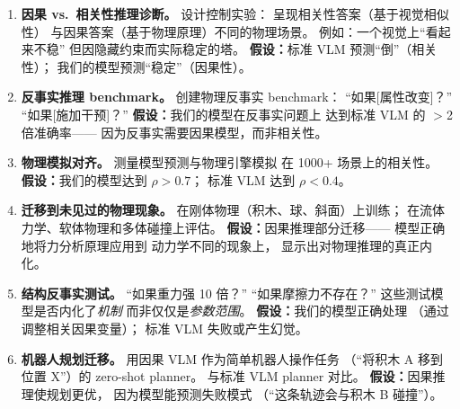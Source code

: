 \documentclass[12pt,a4paper]{article}
\begin{document}
\begin{expbox}
\begin{enumerate}[leftmargin=1.5em]
  \item \textbf{因果 vs.\ 相关性推理诊断。}
    设计控制实验：
    呈现相关性答案（基于视觉相似性）
    与因果答案（基于物理原理）不同的物理场景。
    例如：一个视觉上``看起来不稳''
    但因隐藏约束而实际稳定的塔。
    \textbf{假设：}标准 VLM 预测``倒''（相关性）；
    我们的模型预测``稳定''（因果性）。

  \item \textbf{反事实推理 benchmark。}
    创建物理反事实 benchmark：
    ``如果[属性改变]？'' ``如果[施加干预]？''
    \textbf{假设：}我们的模型在反事实问题上
    达到标准 VLM 的 $>$2 倍准确率——
    因为反事实需要因果模型，而非相关性。

  \item \textbf{物理模拟对齐。}
    测量模型预测与物理引擎模拟
    在 1000+ 场景上的相关性。
    \textbf{假设：}我们的模型达到 $\rho > 0.7$；
    标准 VLM 达到 $\rho < 0.4$。

  \item \textbf{迁移到未见过的物理现象。}
    在刚体物理（积木、球、斜面）上训练；
    在流体力学、软体物理和多体碰撞上评估。
    \textbf{假设：}因果推理部分迁移——
    模型正确地将力分析原理应用到
    动力学不同的现象上，
    显示出对物理推理的真正内化。

  \item \textbf{结构反事实测试。}
    ``如果重力强 10 倍？'' ``如果摩擦力不存在？''
    这些测试模型是否内化了\textit{机制}
    而非仅仅是\textit{参数范围}。
    \textbf{假设：}我们的模型正确处理
    （通过调整相关因果变量）；
    标准 VLM 失败或产生幻觉。

  \item \textbf{机器人规划迁移。}
    用因果 VLM 作为简单机器人操作任务
    （``将积木 A 移到位置 X''）的 zero-shot planner。
    与标准 VLM planner 对比。
    \textbf{假设：}因果推理使规划更优，
    因为模型能预测失败模式
    （``这条轨迹会与积木 B 碰撞''）。
\end{enumerate}
\end{expbox}
\end{document}
